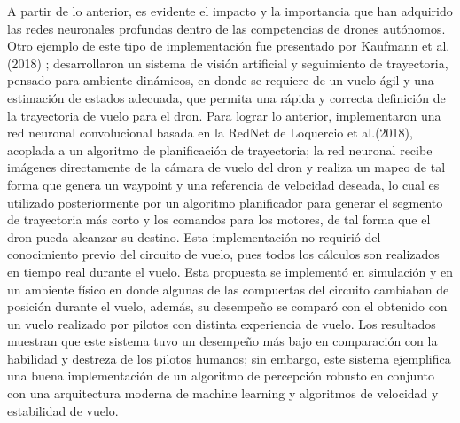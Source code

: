 A partir de lo anterior, es evidente el impacto y la importancia que han adquirido las redes neuronales profundas dentro de las competencias de drones autónomos. Otro ejemplo de este tipo de implementación fue presentado por Kaufmann et al. (2018) \cite{kaufmann2018deep};  desarrollaron un sistema de visión artificial y seguimiento de trayectoria, pensado para ambiente dinámicos, en donde se requiere de un vuelo ágil y una estimación de estados adecuada, que permita una rápida y correcta definición de la trayectoria de vuelo para el dron. 
Para lograr lo anterior, implementaron una red neuronal convolucional basada en la RedNet de Loquercio et al.(2018)\cite{loquercio2018dronet}, acoplada a un algoritmo de planificación de trayectoria; la red neuronal recibe imágenes directamente de la cámara de vuelo del dron y realiza un mapeo de tal forma que genera un waypoint y una referencia de velocidad deseada, lo cual es utilizado posteriormente por un algoritmo planificador para generar el segmento de trayectoria más corto y los comandos para los motores, de tal forma que el dron pueda alcanzar su destino. Esta implementación no requirió del conocimiento previo del circuito de vuelo, pues todos los cálculos son realizados en tiempo real durante el vuelo. Esta propuesta se implementó en simulación y en un ambiente físico en donde algunas de las compuertas del circuito cambiaban de posición durante el vuelo, además, su desempeño se comparó con el obtenido con un vuelo realizado por pilotos con distinta experiencia de vuelo. Los resultados muestran que este sistema tuvo un desempeño más bajo en comparación con la habilidad y destreza de los pilotos humanos; sin embargo, este sistema ejemplifica una buena implementación de un algoritmo de percepción robusto en conjunto con una arquitectura moderna de machine learning y algoritmos de velocidad y estabilidad de vuelo. 

